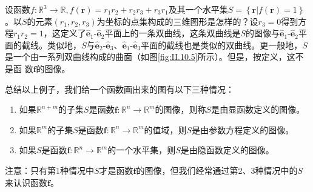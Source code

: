 \documentclass[main.tex]{subfiles}
\begin{document}
\begin{example}\label{exp:II.12.8}
设函数$f:\mathbb{R}^3\rightarrow\mathbb{R},f\left(\mathbf{r}\right)=r_1r_2+r_2r_3+r_3r_1$及其一个水平集$S=\left\{\mathbf{r}|f\left(\mathbf{r}\right)=1\right\}$。以$S$的元素$\left(r_1,r_2,r_3\right)$为坐标的点集构成的三维图形是怎样的？设$r_3=0$得到方程$r_1r_2=1$，这定义了$\mathbf{\hat{e}}_1$-$\mathbf{\hat{e}}_2$平面上的一条双曲线，这条双曲线是$S$的图像与$\mathbf{\hat{e}}_1$-$\mathbf{\hat{e}}_2$平面的截线。类似地，$S$与$\mathbf{\hat{e}}_2$-$\mathbf{\hat{e}}_3$、$\mathbf{\hat{e}}_1$-$\mathbf{\hat{e}}_3$平面的截线也是类似的双曲线。更一般地，$S$是一个由一系列双曲线构成的曲面（如图\ref{fig:II.10.5}所示）。但是，按定义，这不是函
数$\mathbf{f}$的图像。
\end{example}

总结以上例子，我们给一个函数画出来的图有以下三种情况：

\begin{enumerate}
\item 如果$\mathbb{R}^{n+m}$的子集$S$是函数$\mathbf{f}:\mathbb{R}^n\rightarrow\mathbb{R}^m$的图像，则称$S$是由显函数定义的图像。
\item 如果$\mathbb{R}^{m}$的子集$S$是函数$\mathbf{f}:\mathbb{R}^n\rightarrow\mathbb{R}^m$的值域，则$S$是由参数方程定义的图像。
\item 如果$S$是函数$\mathbf{f}:\mathbb{R}^n\rightarrow\mathbb{R}^m$的一个水平集，则$S$是由隐函数定义的图像。
\end{enumerate}

注意：只有第1种情况中$S$才是函数$\mathbf{f}$的图像，但我们经常通过第2、3种情况中的$S$来认识函数$\mathbf{f}$。
\end{document}
